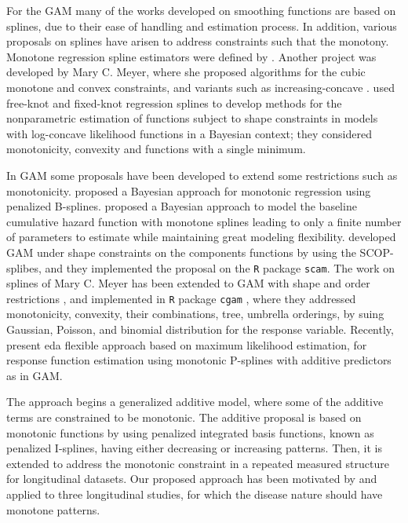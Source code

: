 \documentclass[11pt,letterpaper]{article}
\begin{document}
 
For the GAM many of the works developed on smoothing functions are based on splines, due to their ease of handling and estimation process. 
In addition, various proposals on splines have arisen to address constraints such that the monotony. 
Monotone regression spline estimators were defined by \cite{Ram88}.  
Another project was developed by Mary C. Meyer, where she proposed  algorithms for the cubic monotone and  convex constraints,  and variants such as increasing-concave \citep{Mey08,Mey12}. 
\cite{ShiWalDam11} used free-knot and fixed-knot regression splines to develop methods for the nonparametric estimation of functions subject to shape constraints in models with log-concave likelihood functions in a Bayesian context; they considered monotonicity, convexity and functions with a single minimum.  



In GAM some proposals have been developed to extend some restrictions such as monotonicity. 
\cite{BreSte08} proposed a Bayesian approach for monotonic regression using penalized B-splines.  
\cite{CaiLinWan11} proposed a Bayesian approach to model the baseline cumulative hazard function with monotone splines leading to only a finite number of parameters to estimate while maintaining great modeling flexibility. 
 \cite{PyaWoo15} developed GAM under shape constraints on the components functions by using the SCOP-splibes, and they implemented the proposal on the \texttt{R} package \texttt{scam}.  
The work on splines of Mary C. Meyer has been extended to GAM with shape and order restrictions \cite{Mey18}, and implemented in \texttt{R} package  \texttt{cgam} \cite{LiaMey19},  where they addressed monotonicity, convexity, their combinations, tree, umbrella orderings, by suing Gaussian, Poisson, and binomial distribution for the response variable.    
Recently, \cite{SpiKneOtt19} present eda flexible approach based on maximum likelihood estimation, for response function estimation using monotonic P-splines with additive predictors as in GAM. 



The approach begins a generalized additive  model, where some of the additive terms are constrained to be monotonic. The additive proposal is based on monotonic functions by using penalized integrated basis functions, known as  penalized I-splines,  having either decreasing or increasing patterns.   Then, it is extended to address the monotonic constraint in a repeated measured structure for longitudinal datasets. 
Our proposed approach has been motivated by and applied to three longitudinal studies, for which the disease nature should have monotone patterns. 
\end{document}
